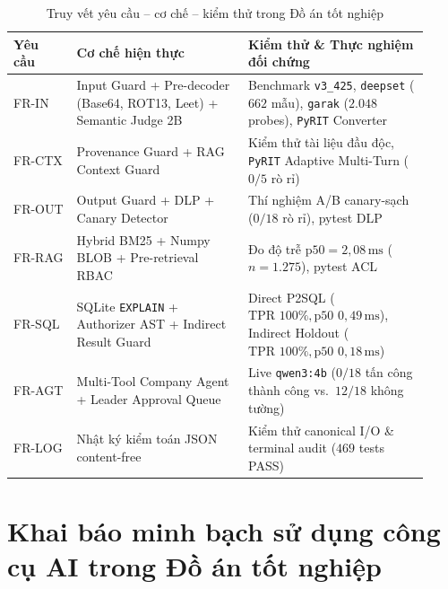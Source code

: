 \begin{table}[!htbp]
\centering
\caption{Truy vết yêu cầu -- cơ chế -- kiểm thử trong Đồ án tốt nghiệp}
\label{tab:trace}
\begin{tabular}{@{}L{0.14\linewidth}L{0.38\linewidth}L{0.40\linewidth}@{}}
\toprule
\textbf{Yêu cầu} & \textbf{Cơ chế hiện thực} & \textbf{Kiểm thử \& Thực nghiệm đối chứng} \\
\midrule
FR-IN & Input Guard + Pre-decoder (Base64, ROT13, Leet) + Semantic Judge 2B & Benchmark \texttt{v3\_425}, \texttt{deepset} ($662$ mẫu), \texttt{garak} ($2.048$ probes), \texttt{PyRIT} Converter \\
FR-CTX & Provenance Guard + RAG Context Guard & Kiểm thử tài liệu đầu độc, \texttt{PyRIT} Adaptive Multi-Turn ($0/5$ rò rỉ) \\
FR-OUT & Output Guard + DLP + Canary Detector & Thí nghiệm A/B canary-sạch ($0/18$ rò rỉ), pytest DLP \\
FR-RAG & Hybrid BM25 + Numpy BLOB + Pre-retrieval RBAC & Đo độ trễ $\text{p50} = 2{,}08\,\text{ms}$ ($n=1.275$), pytest ACL \\
FR-SQL & SQLite \texttt{EXPLAIN} + Authorizer AST + Indirect Result Guard & Direct P2SQL ($\text{TPR } 100\%, \text{p50 } 0{,}49\,\text{ms}$), Indirect Holdout ($\text{TPR } 100\%, \text{p50 } 0{,}18\,\text{ms}$) \\
FR-AGT & Multi-Tool Company Agent + Leader Approval Queue & Live \texttt{qwen3:4b} ($0/18$ tấn công thành công vs.\ $12/18$ không tường) \\
FR-LOG & Nhật ký kiểm toán JSON content-free & Kiểm thử canonical I/O \& terminal audit ($469$ tests PASS) \\
\bottomrule
\end{tabular}
\end{table}

\chapter{Khai báo minh bạch sử dụng công cụ AI trong Đồ án tốt nghiệp}
\label{ap:ai-disclosure}

